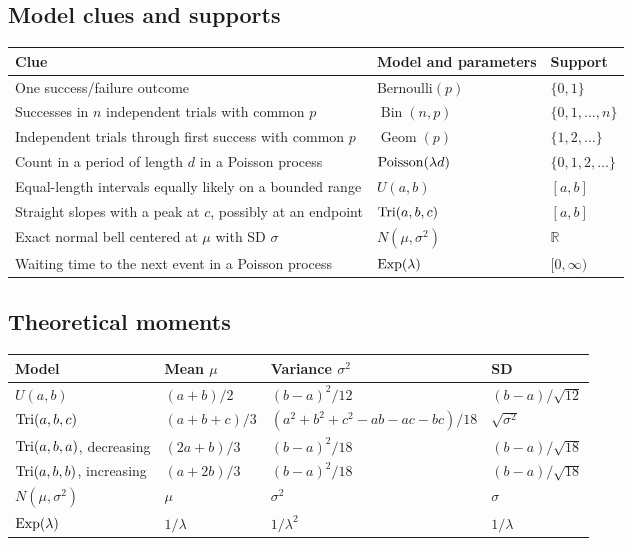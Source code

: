 \subsection*{Model clues and supports}
{\small
\begin{tabularx}{\linewidth}{@{}Y l l@{}}
\toprule
\textbf{Clue} & \textbf{Model and parameters} & \textbf{Support}\\
\midrule
One success/failure outcome & Bernoulli\((p)\) & \(\{0,1\}\)\\
Successes in \(n\) independent trials with common \(p\) & \(\operatorname{Bin}(n,p)\) & \(\{0,1,\dots,n\}\)\\
Independent trials through first success with common \(p\) & \(\operatorname{Geom}(p)\) & \(\{1,2,\dots\}\)\\
Count in a period of length \(d\) in a Poisson process & \(\operatorname{Poisson}(\lambda d)\) & \(\{0,1,2,\dots\}\)\\
Equal-length intervals equally likely on a bounded range & \(U(a,b)\) & \([a,b]\)\\
Straight slopes with a peak at \(c\), possibly at an endpoint & \(\operatorname{Tri}(a,b,c)\) & \([a,b]\)\\
Exact normal bell centered at \(\mu\) with SD \(\sigma\) & \(N(\mu,\sigma^2)\) & \(\mathbb R\)\\
Waiting time to the next event in a Poisson process & \(\operatorname{Exp}(\lambda)\) & \([0,\infty)\)\\
\bottomrule
\end{tabularx}
}

\subsection*{Theoretical moments}
{\small
\begin{tabularx}{\linewidth}{@{}Y l l l@{}}
\toprule
\textbf{Model} & \textbf{Mean \(\mu\)} & \textbf{Variance \(\sigma^2\)} & \textbf{SD}\\
\midrule
\(U(a,b)\) & \((a+b)/2\) & \((b-a)^2/12\) & \((b-a)/\sqrt{12}\)\\
\(\operatorname{Tri}(a,b,c)\) & \((a+b+c)/3\) & \((a^2+b^2+c^2-ab-ac-bc)/18\) & \(\sqrt{\sigma^2}\)\\
\(\operatorname{Tri}(a,b,a)\), decreasing & \((2a+b)/3\) & \((b-a)^2/18\) & \((b-a)/\sqrt{18}\)\\
\(\operatorname{Tri}(a,b,b)\), increasing & \((a+2b)/3\) & \((b-a)^2/18\) & \((b-a)/\sqrt{18}\)\\
\(N(\mu,\sigma^2)\) & \(\mu\) & \(\sigma^2\) & \(\sigma\)\\
\(\operatorname{Exp}(\lambda)\) & \(1/\lambda\) & \(1/\lambda^2\) & \(1/\lambda\)\\
\bottomrule
\end{tabularx}
}

